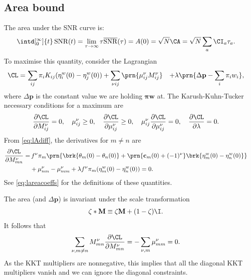 \documentclass[12pt]{article}
\newcommand{\prm}{p}
\newcommand{\pr}{\mathbf{\prm}}
\newcommand{\eqm}{\pi}
\newcommand{\eq}{\boldsymbol{\eqm}}
\newcommand{\etwm}{\eta^w}
\newcommand{\thbm}{\theta}
\newcommand{\wm}{w}
\newcommand{\w}{\mathbf{\wm}}
\newcommand{\MMdm}{M}
\newcommand{\MMd}{\mathbf{\MMdm}}
\newcommand{\encm}{K}
\DeclareMathOperator{\snr}{SNR}
\newcommand{\snrb}{\overline{\snr}}
\renewcommand{\pdiff}[2]{\frac{\partial #1}{\partial #2}}
\begin{document}

\subsection{Area bound}\label{sec:area}

The area under the SNR curve is:
%
\begin{equation}\label{eq:areadef}
  \intd[_0^\infty]{t} \snr(t) = \lim_{\tau\to\infty} \tau \snrb(\tau) 
      = A(0) = \sqrt{N} \CA = \sqrt{N} \sum_a \CI_a \tau_a.
\end{equation}
%
To maximise this quantity, consider the Lagrangian
%
\begin{equation}\label{eq:arealagrangian}
\begin{aligned}
  \CL =&\, \sum_{ij} \eqm_i \encm_{ij} (\etwm_i(0) - \etwm_j(0))
        +\sum_{\nu i j} \prn{ \mu^\nu_{ij} \MMdm^\nu_{ij} }
        &+ \lambda \prn{ \Delta\pr - \sum_i \eqm_i \wm_i },
\end{aligned}
\end{equation}
%
where \(\Delta\pr\) is the constant value we are holding \(\eq\w\) at.
The Karush-Kuhn-Tucker necessary conditions for a maximum are
%
\begin{equation}\label{eq:KTarea}
  \pdiff{\CL}{\MMdm^\nu_{ij}} = 0, \quad
  \mu^\nu_{ij} \geq 0, \quad
  \pdiff{\CL}{\mu^\nu_{ij}} \geq 0, \quad
  \mu^\nu_{ij}\pdiff{\CL}{\mu^\nu_{ij}} = 0, \quad
  \pdiff{\CL}{\lambda} = 0.
\end{equation}
%
From \cref{eq:lAdiff}, the derivatives for \(m \neq n\) are
%
\begin{equation}\label{eq:areaderivs}
\begin{aligned}
  \pdiff{\CL}{\MMdm^\nu_{mn}} = & \,
    f^\nu \eqm_m \prn{ \brk{\thbm_m(0) - \thbm_n(0)}
     + \prn{\mathbf{c}_m(0) + (-1)^\nu} \brk{\etwm_m(0) - \etwm_n(0)} } \\
     &+ \mu^\nu_{mn} -  \mu^\nu_{mm}
     + \lambda f^\nu \eqm_m (\etwm_{m}(0)-\etwm_{n}(0)) 
    = 0.
\end{aligned}
\end{equation}
%
See \cref{eq:lareacoeffs} for the definitions of these quantities.

The area (and \(\Delta\pr\)) is invariant under the scale transformation
%
\begin{equation}\label{eq:scale}
  \zeta * \MMd \equiv \zeta \MMd + (1-\zeta)\I .
\end{equation}
%
It follows that
%
\begin{equation*}
  \sum_{\nu, m \neq n} \MMdm^\nu_{mn} \pdiff{\CL}{\MMdm^\nu_{mn}} = - \sum_{\nu, m} \mu^\nu_{mm} = 0 .
\end{equation*}
%
As the KKT multipliers are nonnegative, this implies that all the diagonal KKT multipliers vanish and we can ignore the diagonal constraints.
\end{document}
